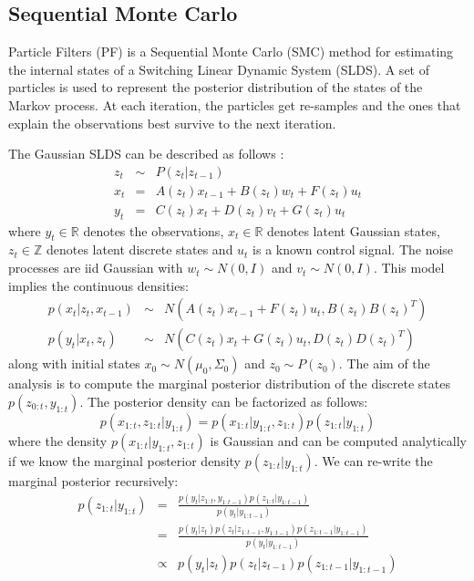 \subsection{Sequential Monte Carlo}

Particle Filters (PF) is a Sequential Monte Carlo (SMC) method for estimating the internal states of a Switching Linear Dynamic System (SLDS). A set of particles is used to represent the posterior distribution of the states of the Markov process. At each iteration, the particles get re-samples and the ones that explain the observations best survive to the next iteration.

The Gaussian SLDS can be described as follows \cite{deFreitas2002}:
\begin{eqnarray}
    z_t &\sim& P(z_t | z_{t-1})\\
    x_t &=& A(z_t)x_{t-1} + B(z_t)w_t + F(z_t)u_t \\
    y_t &=& C(z_t)x_t + D(z_t)v_t + G(z_t)u_t
\end{eqnarray}
where $y_t \in \mathbb{R}$ denotes the observations, $x_t \in \mathbb{R}$ denotes latent Gaussian states, $z_t \in \mathbb{Z}$ denotes latent discrete states and $u_t$ is a known control signal. The noise processes are iid Gaussian with $w_t \sim N(0,I)$ and $v_t \sim N(0,I)$. This model implies the continuous densities:
\begin{eqnarray}\label{equ:smc_density}
    p(x_t|z_t,x_{t-1}) &\sim& N(A(z_t)x_{t-1} + F(z_t)u_t, B(z_t)B(z_t)^{T})\\
    p(y_t|x_t,z_t) &\sim& N(C(z_t)x_t + G(z_t)u_t, D(z_t)D(z_t)^{T})
\end{eqnarray}
along with initial states $x_0 \sim N(\mu_0,\Sigma_0)$ and $z_0 \sim P(z_0)$. The aim of the analysis is to compute the marginal posterior distribution of the discrete states $p(z_{0:t}, y_{1:t})$. The posterior density can be factorized as follows:
\begin{equation}
    p(x_{1:t},z_{1:t}|y_{1:t}) = p(x_{1:t}|y_{1:t},z_{1:t})p(z_{1:t}|y_{1:t})
\end{equation}
where the density $p(x_{1:t}|y_{1:t},z_{1:t})$ is Gaussian and can be computed analytically if we know the marginal posterior density $p(z_{1:t}|y_{1:t})$. We can re-write the marginal posterior recursively:
\begin{eqnarray}
   p(z_{1:t}|y_{1:t}) &=& \frac{p(y_t|z_{1:t}, y_{1:t-1})p(z_{1:t}|y_{1:t-1})}{p(y_t|y_{1:t-1})}\\
   &=& \frac{p(y_t|z_t)p(z_t|z_{1:t-1},y_{1:t-1})p(z_{1:t-1}|y_{1:t-1})}{p(y_t|y_{1:t-1})}\\
   &\propto& p(y_t|z_t)p(z_t|z_{t-1})p(z_{1:t-1}|y_{1:t-1})
\end{eqnarray}
